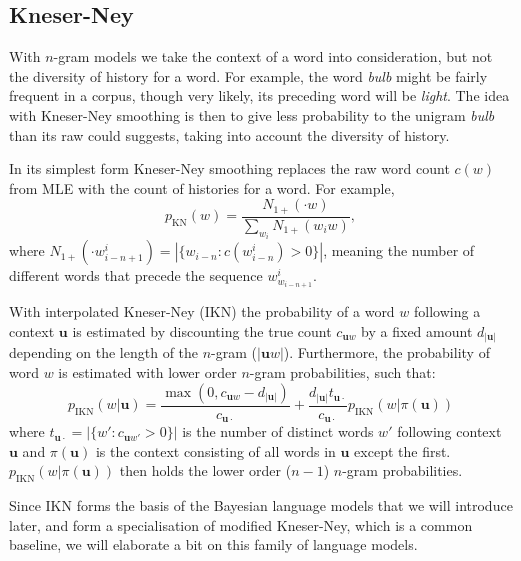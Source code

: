 \subsection{Kneser-Ney}
With $n$-gram models we take the context of a word into consideration, but not the diversity of history for a word. For example, the word \emph{bulb} might be fairly frequent in a corpus, though very likely, its preceding word will be \emph{light}. The idea with Kneser-Ney smoothing is then to give less probability to the unigram \emph{bulb} than its raw could suggests, taking into account the diversity of history.

In its simplest form\cite{kneser1995improved} Kneser-Ney smoothing replaces the raw word count $c(w)$ from MLE with the count of histories for a word. For example,  
\begin{equation}
p_{\operatorname{KN}}(w) = \frac{N_{1+} (\cdot w)}{\sum_{w_i}N_{1+} (w_iw)},
\end{equation}
where $N_{1+}(\cdot w^i_{i-n+1}) = |\{w_{i-n} : c(w^i_{i-n} )> 0\}|$, meaning the number of different words that precede the sequence $w^i_{w_{i-n+1}}$.

With interpolated Kneser-Ney (IKN) the probability of a word $w$ following a context $\mathbf{u}$ is estimated by discounting the true count $c_{\mathbf{u}w}$ by a fixed amount $d_{|\mathbf{u}|}$ depending on the length of the $n$-gram ($|\mathbf{u}w|$). Furthermore, the probability of word $w$ is estimated with lower order $n$-gram probabilities, such that:
\begin{equation}
p_{\operatorname{IKN}}(w|\mathbf{u}) = \frac{\max(0, c_{\mathbf{u}w} - d_{|\mathbf{u}|})}{c_{\mathbf{u}\cdot}} + \frac{d_{|\mathbf{u}|}t_{\mathbf{u}\cdot}}{c_{\mathbf{u}\cdot}}p_{\operatorname{IKN}}(w|\pi(\mathbf{u}))
\end{equation}
where $t_{\mathbf{u}\cdot} = |\{ w' : c_{\mathbf{u}w'} > 0 \}|$ is the number of distinct words $w'$ following context $\mathbf{u}$ and $\pi(\mathbf{u})$ is the context consisting of all words in $\mathbf{u}$ except the first. $p_{\operatorname{IKN}}(w|\pi(\mathbf{u}))$ then holds the lower order ($n-1$) $n$-gram probabilities. 

Since IKN forms the basis of the Bayesian language models that we will introduce later, and form a specialisation of modified Kneser-Ney, which is a common baseline, we will elaborate a bit on this family of language models.

